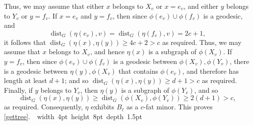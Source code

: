 \documentclass[titlepage,11pt]{article}
\newcommand\blackslug{\hbox{\hskip 1pt \vrule width 4pt height 8pt depth 1.5pt
		\hskip 1pt}}
\newcommand\bbox{\hfill \quad \blackslug \bigbreak}
\newcommand{\dist}{\operatorname{dist}}
\begin{document}
	
	
	Thus,
	we may assume that either $x$ belongs to $X_v$ or $x=e_v$, and either $y$ belongs to $Y_v$
	or $y=f_v$. If $x=e_v$ and $y=f_v$, then since $\phi(e_v)\cup \phi(f_v)$ is a geodesic, and
	$$\dist_G(\eta(e_v),v)=\dist_G(\eta(f_v),v) = 2c+1,$$
	it follows that
	$\dist_G(\eta(x),\eta(y))\ge 4c+2>c$ as required. Thus, we may assume that $x$ belongs to $X_v$, and hence $\eta(x)$ is a subgraph
	of $\phi(X_v)$. If $y=f_v$, then since $\phi(e_v)\cup \phi(f_v)$ is a geodesic between $\phi(X_v), \phi(Y_v)$, there is a geodesic
	between $\eta(y), \phi(X_v)$ that contains $\phi(e_v)$, and therefore has length at least $d+1$; and so
	$\dist_G(\eta(x),\eta(y))\ge d+1>c$ as required. Finally, if $y$ belongs to $Y_v$, then $\eta(y)$ is a subgraph of $\phi(Y_v)$,
	and so
	$$\dist_G(\eta(x), \eta(y))\ge \dist_G(\phi(X_v),\phi(Y_v))\ge 2(d+1) >c,$$
	as required. Consequently, $\eta$ exhibits $B_\ell$ as a $c$-fat minor. This proves \ref{gettree}.~\bbox
	
	
	
\end{document}
